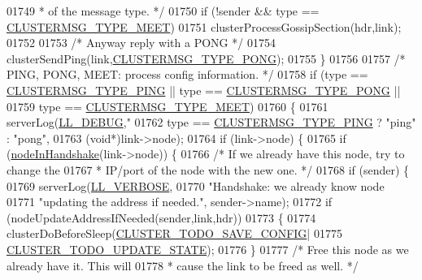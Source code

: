 \begin{DoxyCode}
{{{{{{{{{{{{{{{{{{{{{{{{{{01749 \textcolor{comment}{         * of the message type. */}
01750         \textcolor{keywordflow}{if} (!sender && type == \hyperlink{cluster_8h_aaf264f57ae1869c57093fd9fbc6fc5bc}{CLUSTERMSG\_TYPE\_MEET})
01751             clusterProcessGossipSection(hdr,link);
01752 
01753         \textcolor{comment}{/* Anyway reply with a PONG */}
01754         clusterSendPing(link,\hyperlink{cluster_8h_a33e9439f462f28177a31dfc74de0c16b}{CLUSTERMSG\_TYPE\_PONG});
01755     \}
01756 
01757     \textcolor{comment}{/* PING, PONG, MEET: process config information. */}
01758     \textcolor{keywordflow}{if} (type == \hyperlink{cluster_8h_aeb8a936505e22f64e5039523a3c96d4c}{CLUSTERMSG\_TYPE\_PING} || type == 
      \hyperlink{cluster_8h_a33e9439f462f28177a31dfc74de0c16b}{CLUSTERMSG\_TYPE\_PONG} ||
01759         type == \hyperlink{cluster_8h_aaf264f57ae1869c57093fd9fbc6fc5bc}{CLUSTERMSG\_TYPE\_MEET})
01760     \{
01761         serverLog(\hyperlink{server_8h_abcaffe365dee628fcf9fc90c69d534a1}{LL\_DEBUG},\textcolor{stringliteral}{"%
01762             type == \hyperlink{cluster_8h_aeb8a936505e22f64e5039523a3c96d4c}{CLUSTERMSG\_TYPE\_PING} ? \textcolor{stringliteral}{"ping"} : \textcolor{stringliteral}{"pong"},
01763             (\textcolor{keywordtype}{void}*)link->node);
01764         \textcolor{keywordflow}{if} (link->node) \{
01765             \textcolor{keywordflow}{if} (\hyperlink{cluster_8h_a70f1a5bb82f54ce5d17b13de42176790}{nodeInHandshake}(link->node)) \{
01766                 \textcolor{comment}{/* If we already have this node, try to change the}
01767 \textcolor{comment}{                 * IP/port of the node with the new one. */}
01768                 \textcolor{keywordflow}{if} (sender) \{
01769                     serverLog(\hyperlink{server_8h_a479b60032f8da6d8ad72e1a9d0809950}{LL\_VERBOSE},
01770                         \textcolor{stringliteral}{"Handshake: we already know node %
01771                         \textcolor{stringliteral}{"updating the address if needed."}, sender->name);
01772                     \textcolor{keywordflow}{if} (nodeUpdateAddressIfNeeded(sender,link,hdr))
01773                     \{
01774                         clusterDoBeforeSleep(\hyperlink{cluster_8h_a0ae5ff08fbae3c655012b4de8bfc327d}{CLUSTER\_TODO\_SAVE\_CONFIG}|
01775                                              \hyperlink{cluster_8h_abea0d393cba342261e4a7e6fb745f388}{CLUSTER\_TODO\_UPDATE\_STATE});
01776                     \}
01777                     \textcolor{comment}{/* Free this node as we already have it. This will}
01778 \textcolor{comment}{                     * cause the link to be freed as well. */}
}}}}}}}}}}}}}}}}}}}}}}}}}}}}
\end{DoxyCode}
